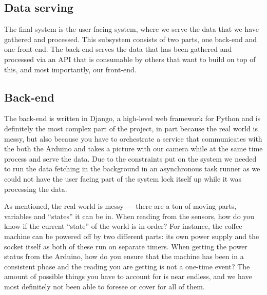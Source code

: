 \documentclass[12pt,a4paper,oneside,article]{memoir}
\numberwithin{equation}{chapter}
\begin{document}
\subsection{Data serving}\label{sec:data-serving}
The final system is the user facing system, where we serve the data that we have
gathered and processed. This subsystem consists of two parts, one back-end and
one front-end. The back-end serves the data that has been gathered and processed
via an API that is consumable by others that want to build on top of this, and
most importantly, our front-end.

\subsection{Back-end}\label{sec:back-end}
The back-end is written in Django, a high-level web framework for Python and is
definitely the most complex part of the project, in part because the real world
is messy, but also because you have to orchestrate a service that communicates
with the both the Arduino and takes a picture with our camera while at the same
time process and serve the data. Due to the constraints put on the system we
needed to run the data fetching in the background in an asynchronous task
runner as we could not have the user facing part of the system lock itself up
while it was processing the data.

As mentioned, the real world is messy --- there are a ton of moving parts,
variables and ``states'' it can be in. When reading from the sensors, how do you
know if the current ``state'' of the world is in order? For instance, the coffee
machine can be powered off by two different parts: its own power supply and the
socket itself as both of these run on separate timers. When getting the power
status from the Arduino, how do you ensure that the machine has been in a
consistent phase and the reading you are getting is not a one-time event? The
amount of possible things you have to account for is near endless, and we have
most definitely not been able to foresee or cover for all of them.
\end{document}
